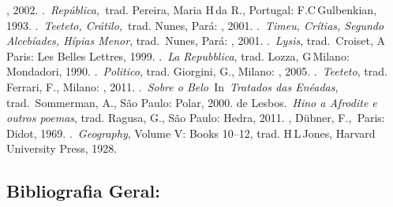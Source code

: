 \begin{bibliohedra}
  , 2002.
.~\emph{República,~}trad. Pereira, Maria H\,da R., Portugal:
  F.C\,Gulbenkian, 1993.
.~\emph{Teeteto, Crátilo,}~trad. Nunes, Pará: , 2001.
.~\emph{Timeu, Crítias, Segundo Alcebíades, Hípias Menor},
  trad.~Nunes, Pará: , 2001.
.~\emph{Lysis}, trad.~Croiset, A\,Paris: Les Belles Lettres,
  1999.
.~\emph{La Repubblica}, trad. Lozza, G\,Milano: Mondadori,
  1990.
.~\emph{Politico}, trad. Giorgini, G., Milano: , 2005.
.~\emph{Teeteto}, trad. Ferrari, F., Milano: , 2011.
.~\emph{Sobre o Belo~}In~\emph{Tratados das Enéadas},
  trad.~Sommerman, A., São Paulo: Polar, 2000.
 de Lesbos.~\emph{Hino a Afrodite e outros poemas}, trad. Ragusa,
  G., São Paulo: Hedra, 2011.
, Dübner, F.\emph{,~}Paris:
  Didot, 1969.
.~\emph{Geography}, Volume V: Books 10--12, trad. H\,L\,Jones,
  Harvard University Press, 1928.
\end{bibliohedra}

 

 

\subsection{Bibliografia Geral:}


